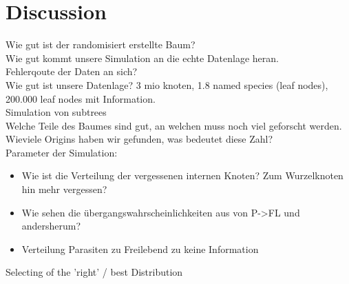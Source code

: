 \chapter{Discussion}
  Wie gut ist der randomisiert erstellte Baum? \\
  Wie gut kommt unsere Simulation an die echte Datenlage heran. \\
  Fehlerqoute der Daten an sich? \\
  Wie gut ist unsere Datenlage? 3 mio knoten, 1.8 named species (leaf nodes), 200.000 leaf nodes mit 
  Information. \\
  Simulation von subtrees \\
  Welche Teile des Baumes sind gut, an welchen muss noch viel geforscht werden. \\
  Wieviele Origins haben wir gefunden, was bedeutet diese Zahl? \\
  
  Parameter der Simulation:
  \begin{itemize}
    \item Wie ist die Verteilung der vergessenen internen Knoten? Zum Wurzelknoten hin mehr vergessen?
    \item Wie sehen die übergangswahrscheinlichkeiten aus von P->FL und andersherum?
    \item Verteilung Parasiten zu Freilebend zu keine Information
  \end{itemize}


  Selecting of the 'right'  / best Distribution
  





